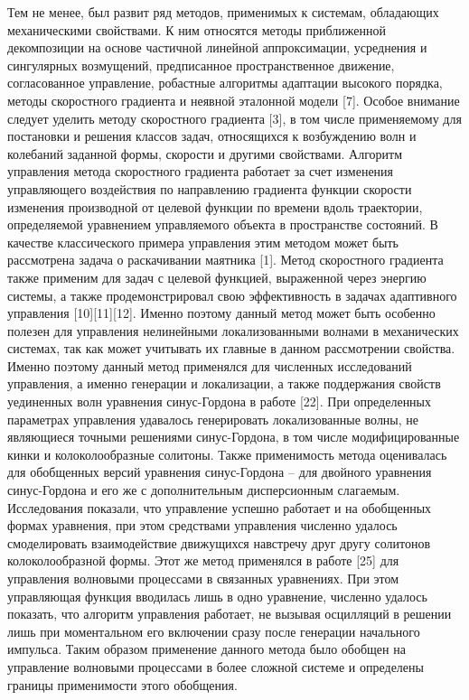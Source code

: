 Тем не менее, был развит ряд методов, применимых к системам, обладающих механическими свойствами. К ним относятся методы приближенной декомпозиции на основе частичной линейной аппроксимации, усреднения и сингулярных возмущений, предписанное пространственное движение, согласованное управление, робастные алгоритмы адаптации высокого порядка, методы скоростного градиента и неявной эталонной модели [7].
Особое внимание следует уделить методу скоростного градиента [3], в том числе применяемому для постановки и решения классов задач, относящихся к возбуждению волн и колебаний заданной формы, скорости и другими свойствами. Алгоритм управления метода скоростного градиента работает за счет изменения управляющего воздействия по направлению градиента функции скорости изменения производной от целевой функции по времени вдоль траектории, определяемой уравнением управляемого объекта в пространстве состояний. 
В качестве классического примера управления этим методом может быть рассмотрена задача о раскачивании маятника [1]. Метод скоростного градиента также применим для задач с целевой функцией, выраженной через энергию системы, а также продемонстрировал свою эффективность в задачах адаптивного управления [10][11][12]. Именно поэтому данный метод может быть особенно полезен для управления нелинейными локализованными волнами в механических системах, так как может учитывать их главные в данном рассмотрении свойства.
Именно поэтому данный метод применялся для численных исследований управления, а именно генерации и локализации, а также поддержания свойств уединенных волн уравнения синус-Гордона в работе [22]. При определенных параметрах управления удавалось генерировать локализованные волны, не являющиеся точными решениями синус-Гордона, в том числе модифицированные кинки и колоколообразные солитоны. Также применимость метода оценивалась для обобщенных версий уравнения синус-Гордона – для двойного уравнения синус-Гордона и его же с дополнительным дисперсионным слагаемым. Исследования показали, что управление успешно работает и на обобщенных формах уравнения, при этом средствами управления численно удалось смоделировать взаимодействие движущихся навстречу друг другу солитонов колоколообразной формы.
Этот же метод применялся в работе [25] для управления волновыми процессами в связанных уравнениях. При этом управляющая функция вводилась лишь в одно уравнение, численно удалось показать, что алгоритм управления работает, не вызывая осцилляций в решении лишь при моментальном его включении сразу после генерации начального импульса. Таким образом применение данного метода было обобщен на управление волновыми процессами в более сложной системе и определены границы применимости этого обобщения.
